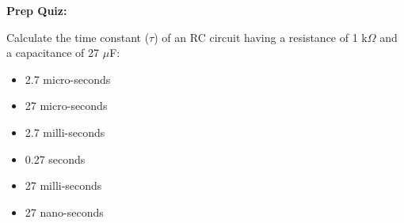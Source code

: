 \vfil \eject

\noindent
{\bf Prep Quiz:}

Calculate the time constant ($\tau$) of an RC circuit having a resistance of 1 k$\Omega$ and a capacitance of 27 $\mu$F:

\begin{itemize}
\item{} 2.7 micro-seconds
\vskip 5pt 
\item{} 27 micro-seconds
\vskip 5pt 
\item{} 2.7 milli-seconds
\vskip 5pt 
\item{} 0.27 seconds
\vskip 5pt 
\item{} 27 milli-seconds
\vskip 5pt 
\item{} 27 nano-seconds
\end{itemize}





